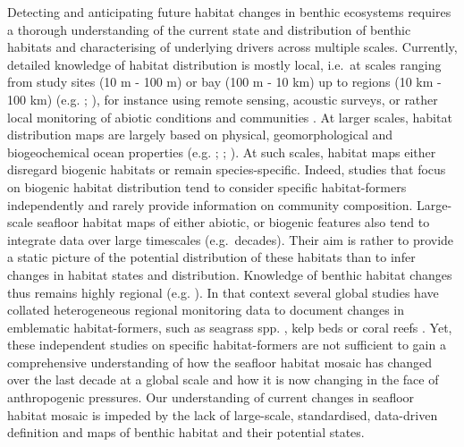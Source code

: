 \begin{refsection}
Detecting and anticipating future habitat changes in benthic ecosystems
requires a thorough understanding of the current state and distribution
of benthic habitats and characterising of underlying drivers across
multiple scales. Currently, detailed knowledge of habitat distribution
is mostly local, i.e.~at scales ranging from study sites (10 m - 100 m)
or bay (100 m - 10 km) up to regions (10 km - 100 km) (e.g.
\textcite{Robert_2015} ; \textcite{Wicaksono_2019}), for instance using
remote sensing, acoustic surveys, or rather local monitoring of abiotic
conditions and communities \autocite{Costello_2009}. At larger scales,
habitat distribution maps are largely based on physical,
geomorphological and biogeochemical ocean properties (e.g.
\textcite{Brown_2011} ; \textcite{Lecours_2015} ;
\textcite{Sonnewald_2020}). At such scales, habitat maps either
disregard biogenic habitats or remain species-specific. Indeed, studies
that focus on biogenic habitat distribution tend to consider specific
habitat-formers independently \autocites[ ]{Assis_2020}{McKenzie_2020}
and rarely provide information on community composition. Large-scale
seafloor habitat maps of either abiotic, or biogenic features also tend
to integrate data over large timescales (e.g.~decades). Their aim is
rather to provide a static picture of the potential distribution of
these habitats than to infer changes in habitat states and distribution.
Knowledge of benthic habitat changes thus remains highly regional (e.g.
\textcite{Cattano_2020}). In that context several global studies have
collated heterogeneous regional monitoring data to document changes in
emblematic habitat-formers, such as seagrass spp. \autocites[
]{Waycott_2009}{Dunic_2021}, kelp beds \autocites[
]{Krumhansl_2016}{Filbee-Dexter_2018} or coral reefs
\autocite{Eddy_2021}. Yet, these independent studies on specific
habitat-formers are not sufficient to gain a comprehensive understanding
of how the seafloor habitat mosaic has changed over the last decade at a
global scale and how it is now changing in the face of anthropogenic
pressures. Our understanding of current changes in seafloor habitat
mosaic is impeded by the lack of large-scale, standardised, data-driven
definition and maps of benthic habitat and their potential states.


\end{refsection}
